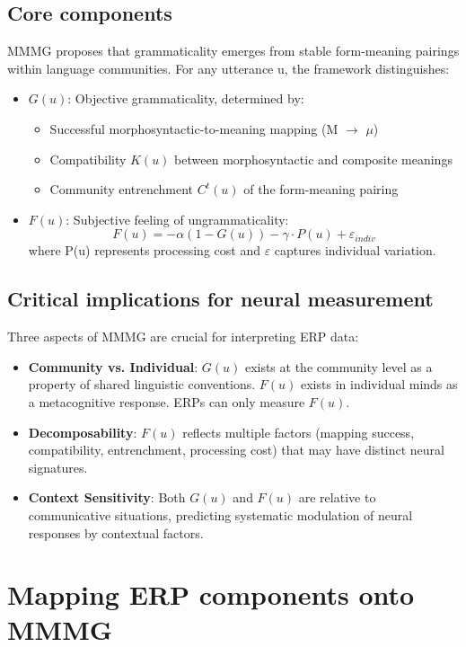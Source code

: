\documentclass[12pt,letterpaper]{article}
\begin{document}
\subsection{Core components}
MMMG proposes that grammaticality emerges from stable form-meaning pairings within language communities. For any utterance u, the framework distinguishes:

\begin{itemize}
    \item $G(u)$: Objective grammaticality, determined by:
    \begin{itemize}
        \item Successful morphosyntactic-to-meaning mapping (M \(\to\) \(\mu\))
        \item Compatibility $K(u)$ between morphosyntactic and composite meanings
        \item Community entrenchment $C^t(u)$ of the form-meaning pairing
    \end{itemize}
    \item $F(u)$: Subjective feeling of ungrammaticality:
    \[
        F(u) = -\alpha(1-G(u)) - \gamma \cdot P(u) + \varepsilon_{indiv}
    \]
    where P(u) represents processing cost and \(\varepsilon\) captures individual variation.
\end{itemize}

\subsection{Critical implications for neural measurement}
Three aspects of MMMG are crucial for interpreting ERP data:

\begin{itemize}
    \item \textbf{Community vs. Individual}: $G(u)$ exists at the community level as a property of shared linguistic conventions. $F(u)$ exists in individual minds as a metacognitive response. ERPs can only measure $F(u)$.
    \item \textbf{Decomposability}: $F(u)$ reflects multiple factors (mapping success, compatibility, entrenchment, processing cost) that may have distinct neural signatures.
    \item \textbf{Context Sensitivity}: Both $G(u)$ and $F(u)$ are relative to communicative situations, predicting systematic modulation of neural responses by contextual factors.
\end{itemize}

\section{Mapping ERP components onto MMMG}
\end{document}
